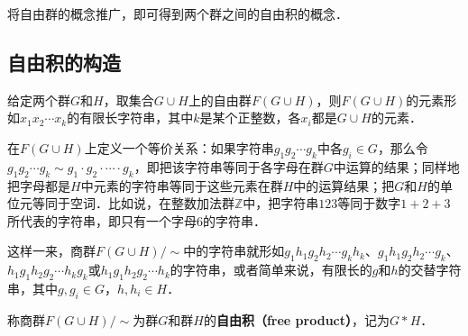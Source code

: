 
将自由群的概念推广，即可得到两个群之间的自由积的概念．

\subsection{自由积的构造}

给定两个群$G$和$H$，取集合$G\cup H$上的自由群$F(G\cup H)$，则$F(G\cup H)$的元素形如$x_1x_2\cdots x_k$的有限长字符串，其中$k$是某个正整数，各$x_i$都是$G\cup H$的元素．

在$F(G\cup H)$上定义一个等价关系：如果字符串$g_1g_2\cdots g_k$中各$g_i\in G$，那么令$g_1g_2\cdots g_k\sim g_1\cdot g_2\cdot\cdots\cdot g_k$，即把该字符串等同于各字母在群$G$中运算的结果；同样地把字母都是$H$中元素的字符串等同于这些元素在群$H$中的运算结果；把$G$和$H$的单位元等同于空词．比如说，在整数加法群$\mathbb{Z}$中，把字符串$123$等同于数字$1+2+3$所代表的字符串，即只有一个字母$6$的字符串．

这样一来，商群$F(G\cup H)/\sim$中的字符串就形如$g_1h_1g_2h_2\cdots g_kh_k$、$g_1h_1g_2h_2\cdots g_k$、$h_1g_1h_2g_2\cdots h_kg_k$或$h_1g_1h_2g_2\cdots h_k$的字符串，或者简单来说，有限长的$g$和$h$的交替字符串，其中$g, g_i\in G$，$h, h_i\in H$．

称商群$F(G\cup H)/\sim$为群$G$和群$H$的\textbf{自由积（free product）}，记为$G*H$．

